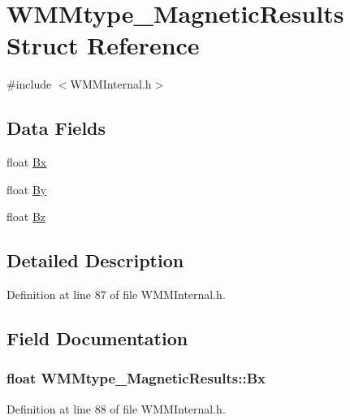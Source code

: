 \hypertarget{struct_w_m_mtype___magnetic_results}{\section{W\-M\-Mtype\-\_\-\-Magnetic\-Results Struct Reference}
\label{struct_w_m_mtype___magnetic_results}
}


{\ttfamily \#include $<$W\-M\-M\-Internal.\-h$>$}

\subsection*{Data Fields}
\begin{DoxyCompactItemize}
\item 
float \hyperlink{struct_w_m_mtype___magnetic_results_ab47b493b060af6221ee19270b4a39529}{Bx}
\item 
float \hyperlink{struct_w_m_mtype___magnetic_results_aa6dcc4f5525f563fd38032ca8ffbf02d}{By}
\item 
float \hyperlink{struct_w_m_mtype___magnetic_results_acdc0be68c71feef834382316e7ea69de}{Bz}
\end{DoxyCompactItemize}


\subsection{Detailed Description}


Definition at line 87 of file W\-M\-M\-Internal.\-h.



\subsection{Field Documentation}
\hypertarget{struct_w_m_mtype___magnetic_results_ab47b493b060af6221ee19270b4a39529}{
\subsubsection[{Bx}]{\setlength{\rightskip}{0pt plus 5cm}float W\-M\-Mtype\-\_\-\-Magnetic\-Results\-::\-Bx}}\label{struct_w_m_mtype___magnetic_results_ab47b493b060af6221ee19270b4a39529}


Definition at line 88 of file W\-M\-M\-Internal.\-h.

